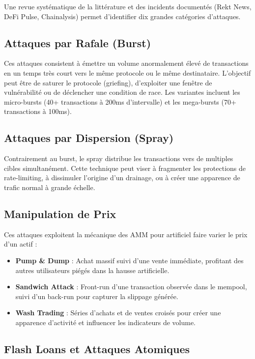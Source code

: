 \documentclass[12pt,a4paper]{report}
\begin{document}
Une revue systématique de la littérature et des incidents documentés (Rekt News, DeFi Pulse, Chainalysis) permet d'identifier dix grandes catégories d'attaques.

\subsection{Attaques par Rafale (Burst)}

Ces attaques consistent à émettre un volume anormalement élevé de transactions en un temps très court vers le même protocole ou le même destinataire. L'objectif peut être de saturer le protocole (griefing), d'exploiter une fenêtre de vulnérabilité ou de déclencher une condition de race. Les variantes incluent les micro-bursts (40+ transactions à 200ms d'intervalle) et les mega-bursts (70+ transactions à 100ms).

\subsection{Attaques par Dispersion (Spray)}

Contrairement au burst, le spray distribue les transactions vers de multiples cibles simultanément. Cette technique peut viser à fragmenter les protections de rate-limiting, à dissimuler l'origine d'un drainage, ou à créer une apparence de trafic normal à grande échelle.

\subsection{Manipulation de Prix}

Ces attaques exploitent la mécanique des AMM pour artificiel faire varier le prix d'un actif :
\begin{itemize}
  \item \textbf{Pump \& Dump} : Achat massif suivi d'une vente immédiate, profitant des autres utilisateurs piégés dans la hausse artificielle.
  \item \textbf{Sandwich Attack} : Front-run d'une transaction observée dans le mempool, suivi d'un back-run pour capturer la slippage générée.
  \item \textbf{Wash Trading} : Séries d'achats et de ventes croisés pour créer une apparence d'activité et influencer les indicateurs de volume.
\end{itemize}

\subsection{Flash Loans et Attaques Atomiques}
\end{document}
